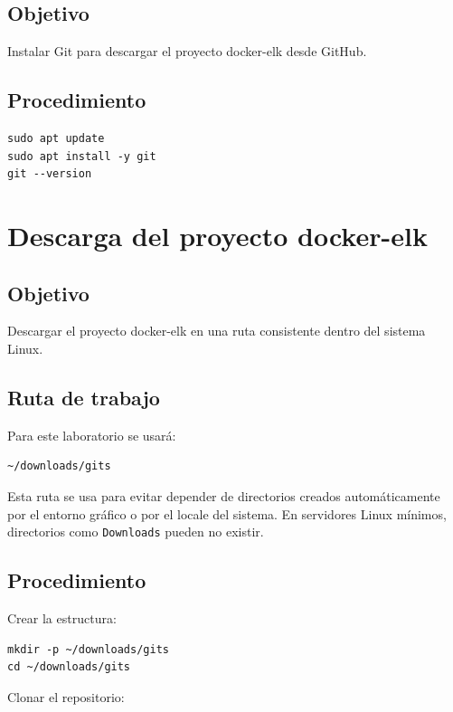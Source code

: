 \documentclass[
  coursetitle={Cómputo Nube y Tecnologías Emergentes},
  coursehours={96},
  coursedate={Verano 2026},
  doctype={Laboratorio},
  otherlangs={english,french},
  authorname={Lázaro},
  authorsurname={Bustio-Martínez},
  authortitle={PhD},
  role={Profesor Investigador},
  email={lbustio@inaoe.mx},
  phone={5559504000},
  ext={7459},
  institution={Instituto Nacional de Astrofísica, Óptica y Electrónica (INAOE)},
  department={Maestría en Ciencias en Tecnologías de Seguridad},
  address={Luis Enrique Erro 1, Sta. Ma. Tonantzintla, San Andrés Cholula, CP 72840, Puebla, México},
  margin={0.5in}
]{../../lbustio_lecture_notes}
\begin{document}
\subsection{Objetivo}

Instalar Git para descargar el proyecto docker-elk desde GitHub.

\subsection{Procedimiento}

\begin{lstlisting}
sudo apt update
sudo apt install -y git
git --version
\end{lstlisting}

\section{Descarga del proyecto docker-elk}

\subsection{Objetivo}

Descargar el proyecto docker-elk en una ruta consistente dentro del sistema Linux.

\subsection{Ruta de trabajo}

Para este laboratorio se usará:

\begin{verbatim}
~/downloads/gits
\end{verbatim}

Esta ruta se usa para evitar depender de directorios creados automáticamente por el entorno gráfico o por el locale del sistema. En servidores Linux mínimos, directorios como \texttt{Downloads} pueden no existir.

\subsection{Procedimiento}

Crear la estructura:

\begin{lstlisting}
mkdir -p ~/downloads/gits
cd ~/downloads/gits
\end{lstlisting}

Clonar el repositorio:
\end{document}
